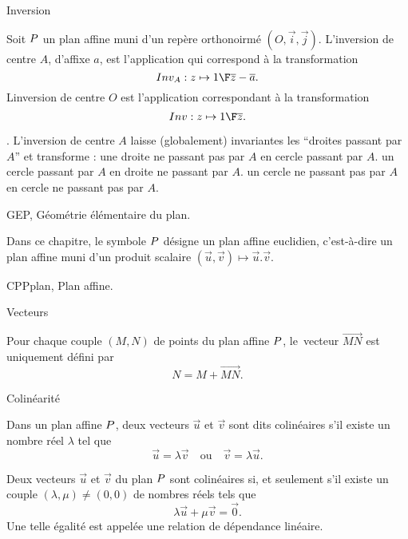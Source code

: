 \Concept [] Inversion

\noindent
Soit $\sc P$ un plan affine muni d'un repère orthonoirmé $(O,\vec i,\vec j)$. L'inversion de centre $A$, d'affixe $a$, est l'application qui correspond à la transformation 
$$
{Inv_A:z\mapsto{1\F\overline z-\overline a}}.
$$
Linversion de centre $O$ est l'application correspondant à la transformation 
$$
{Inv:z\mapsto{1\F\overline z}}.
$$

\Remarque. L'inversion de centre $A$ laisse (globalement) invariantes les ``droites passant par $A$'' et transforme : 
\Bullet une droite ne passant pas par $A$ en cercle passant par $A$.
\Bullet un cercle passant par $A$ en droite ne passant par $A$. 
\Bullet un cercle ne passant pas par $A$ en cercle ne passant pas par $A$. 





















\Chapter GEP, Géométrie élémentaire du plan.

\noindent
Dans ce chapitre, le symbole $\sc P$ désigne un plan affine euclidien, c'est-à-dire un plan affine muni d'un produit scalaire $(\vec u,\vec v)\mapsto\vec u.\vec v$. 



\Section CPPplan, Plan affine. 

\Concept [] Vecteurs
 
\noindent
Pour chaque couple $(M,N)$ de points du plan affine $\sc P$, le~vecteur $\vec{MN}$ est uniquement défini par 
$$
N=M+\vec{MN}.
$$

\Concept [] Colinéarité 

\noindent
Dans un plan affine $\sc P$, deux vecteurs $\vec u$ et $\vec v$ sont dits colinéaires s'il existe un nombre réel $\lambda$ tel que 
$$
\vec u=\lambda\vec v\quad\mbox{ou}\quad\vec v=\lambda\vec u.
$$

\Propriete []  Deux vecteurs $\vec u$ et $\vec v$ du plan $\sc P$ sont colinéaires si, et seulement s'il existe un couple $(\lambda,\mu)\neq(0,0)$ de nombres réels tels que 
$$
\lambda \vec u+\mu\vec v=\vec 0.
$$
Une telle égalité est appelée une relation de dépendance linéaire. 

